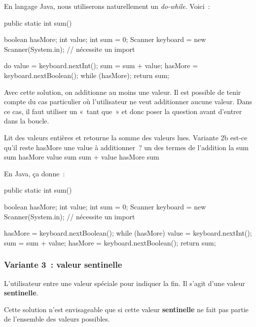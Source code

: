 		En langage Java, nous utiliserons naturellement un \textit{do-while}. 
		Voici~:

		\begin{java}
public static int sum(){
	boolean hasMore;
	int value;
	int sum = 0;
	Scanner keyboard = new Scanner(System.in); // nécessite un import

	do {
		value = keyboard.nextInt();
		sum = sum + value;
		hasMore = keyboard.nextBoolean();
	} while (hasMore);
	return sum;
}
		\end{java}
		
		Avec cette solution, on additionne au moins une valeur.  Il est possible
		de tenir compte du cas particulier où l’utilisateur ne veut additionner
		aucune valeur. Dans ce cas, il faut utiliser un «~tant que~» et donc
		poser la question avant d’entrer dans la boucle.

		\begin{pseudocode}
		\LComment Lit des valeurs entières et retourne la somme des valeurs lues.
		 \RComment Variante 2b
			 \RComment est-ce qu’il reste hasMore une value à additionner~?
			 \RComment un des termes de l’addition
			 \RComment la sum
			\Let sum 
			\Read hasMore
				\Read value
				\Let sum \Gets sum + value 
				\Read hasMore
			\EndWhile
			\Return sum
		\EndAlgo
		\end{pseudocode}

		En Java, ça donne~:

		\begin{java}
public static int sum(){
	boolean hasMore;
	int value;
	int sum = 0;
	Scanner keyboard = new Scanner(System.in); // nécessite un import

	hasMore = keyboard.nextBoolean();
	while (hasMore){
		value = keyboard.nextInt();
		sum = sum + value;
		hasMore = keyboard.nextBoolean();
	}
	return sum;
}
		\end{java}


	\subsubsection{Variante 3~: valeur sentinelle}
		
		L’utilisateur entre une valeur spéciale pour indiquer la fin. Il s'agit
		d'une valeur \textbf{sentinelle}. 
		
		Cette solution n'est envisageable que si cette valeur \textbf{sentinelle} 
		ne fait pas partie de l'ensemble des valeurs possibles. 
		
